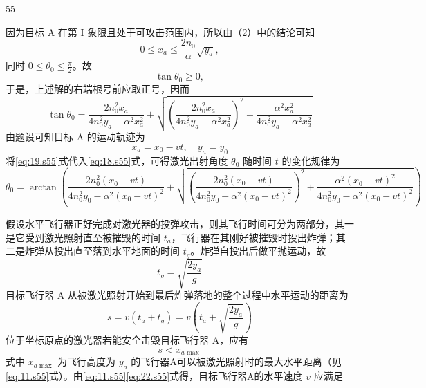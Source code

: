 \begin{solution}{55}
\begin{subsolution}
\begin{equation}
\end{equation}
因为目标 A 在第 I 象限且处于可攻击范围内，所以由（2）中的结论可知
\begin{equation}
0 \leq x_{a} \leq \frac{2n_{0}}{\alpha}\sqrt{y_{a}},
\label{eq:16.s55}
\end{equation}
同时 $0 \leq \theta_{0} \leq \frac{\pi}{2}$。故
\begin{equation}
\tan\theta_{0} \geq 0,
\label{eq:17.s55}
\end{equation}
于是，上述解的右端根号前应取正号，因而
\begin{equation}
\tan\theta_{0} = \frac{2n_{0}^{2}x_{a}}{4n_{0}^{2}y_{a} - \alpha^{2}x_{a}^{2}} + \sqrt{\left(\frac{2n_{0}^{2}x_{a}}{4n_{0}^{2}y_{a} - \alpha^{2}x_{a}^{2}}\right)^{2} + \frac{\alpha^{2}x_{a}^{2}}{4n_{0}^{2}y_{a} - \alpha^{2}x_{a}^{2}}}
\label{eq:18.s55}
\end{equation}
由题设可知目标 A 的运动轨迹为
\begin{equation}
x_{a} = x_{0} - vt, \quad y_{a} = y_{0}
\label{eq:19.s55}
\end{equation}
将\eqref{eq:19.s55}式代入\eqref{eq:18.s55}式，可得激光出射角度 $\theta_{0}$ 随时间 $t$ 的变化规律为
\begin{equation}
\theta_{0} = \arctan\left(\frac{2n_{0}^{2}(x_{0}-vt)}{4n_{0}^{2}y_{0} - \alpha^{2}(x_{0}-vt)^{2}} + \sqrt{\left(\frac{2n_{0}^{2}(x_{0}-vt)}{4n_{0}^{2}y_{0} - \alpha^{2}(x_{0}-vt)^{2}}\right)^{2} + \frac{\alpha^{2}(x_{0}-vt)^{2}}{4n_{0}^{2}y_{0} - \alpha^{2}(x_{0}-vt)^{2}}}\right)
\label{eq:20.s55}
\end{equation}
\end{subsolution}
\begin{subsolution}
假设水平飞行器正好完成对激光器的投弹攻击，则其飞行时间可分为两部分，其一是它受到激光照射直至被摧毁的时间 $t_a$，飞行器在其刚好被摧毁时投出炸弹；其二是炸弹从投出直至落到水平地面的时间 $t_g$。炸弹自投出后做平抛运动，故
\begin{equation}
t_{g} = \sqrt{\frac{2y_{a}}{g}}
\label{eq:21.s55}
\end{equation}
目标飞行器 A 从被激光照射开始到最后炸弹落地的整个过程中水平运动的距离为
\begin{equation}
s = v(t_{a} + t_{g}) = v\left(t_{a} + \sqrt{\frac{2y_{a}}{g}}\right)
\label{eq:22.s55}
\end{equation}
位于坐标原点的激光器若能安全击毁目标飞行器 A，应有
\begin{equation}
s < x_{a\max}
\label{eq:23.s55}
\end{equation}
式中 $x_{a\max}$ 为飞行高度为 $y_{a}$ 的飞行器A可以被激光照射时的最大水平距离（见\eqref{eq:11.s55}式）。由\eqref{eq:11.s55}\eqref{eq:22.s55}式得，目标飞行器A的水平速度 $v$ 应满足

\end{subsolution}
\end{solution}
